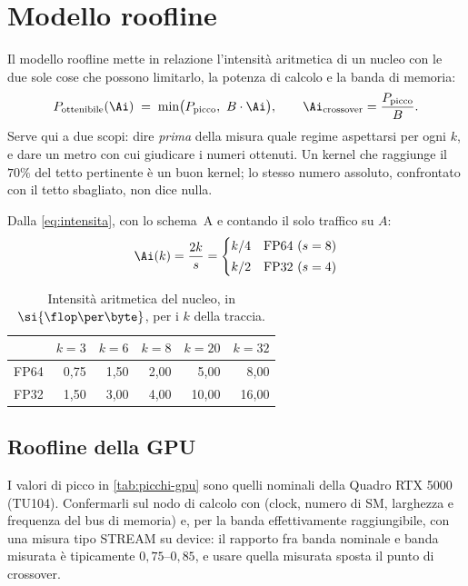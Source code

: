\chapter{Modello roofline}
\label{cap:roofline}

Il modello roofline mette in relazione l'intensit\`a aritmetica di un nucleo con
le due sole cose che possono limitarlo, la potenza di calcolo e la banda di
memoria:
\begin{equation}
  P_{\text{ottenibile}}(\Ai) \;=\; \min\bigl(P_{\text{picco}},\ B \cdot \Ai\bigr),
  \qquad
  \Ai_{\text{crossover}} = \frac{P_{\text{picco}}}{B} .
  \label{eq:roofline}
\end{equation}
Serve qui a due scopi: dire \emph{prima} della misura quale regime aspettarsi per
ogni $k$, e dare un metro con cui giudicare i numeri ottenuti. Un kernel che
raggiunge il $70\%$ del tetto pertinente \`e un buon kernel; lo stesso numero
assoluto, confrontato con il tetto sbagliato, non dice nulla.

Dalla \cref{eq:intensita}, con lo schema~A e contando il solo traffico su $A$:
\begin{equation}
  \Ai(k) = \frac{2k}{s} =
  \begin{cases}
    k/4 & \text{FP64 } (s = 8) \\[2pt]
    k/2 & \text{FP32 } (s = 4)
  \end{cases}
  \label{eq:ai-k}
\end{equation}

\begin{table}[H]
\centering
\footnotesize
\caption{Intensit\`a aritmetica del nucleo, in $\si{\flop\per\byte}$, per i $k$
della traccia.}
\label{tab:ai}
\begin{tabular}{@{}lrrrrr@{}}
\toprule
& $k=3$ & $k=6$ & $k=8$ & $k=20$ & $k=32$ \\
\midrule
FP64 & 0,75 & 1,50 & 2,00 & 5,00 & 8,00 \\
FP32 & 1,50 & 3,00 & 4,00 & 10,00 & 16,00 \\
\bottomrule
\end{tabular}
\end{table}

\section{Roofline della GPU}
\label{sec:roofline-gpu}

\begin{daverificare}
I valori di picco in \cref{tab:picchi-gpu} sono quelli nominali della Quadro RTX
5000 (TU104). Confermarli sul nodo di calcolo con  (clock,
numero di SM, larghezza e frequenza del bus di memoria) e, per la banda
effettivamente raggiungibile, con una misura tipo STREAM su device: il rapporto
fra banda nominale e banda misurata \`e tipicamente $0{,}75$--$0{,}85$, e usare
quella misurata sposta il punto di crossover.
\end{daverificare}

